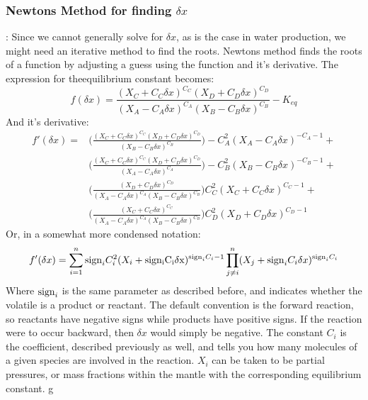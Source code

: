 \subsubsection{Newtons Method for finding $\delta x$}: 
Since we cannot generally solve for $\delta x$, as is the case in water production, we might need an iterative method to find the roots. Newtons method finds the roots of a function by adjusting a guess using the function and it's derivative. The expression for theequilibrium constant becomes: 
\begin{equation}
    f(\delta x) = \frac{(X_C + C_C\delta x)^{C_C} (X_D + C_D\delta x)^{C_D}}{(X_A-C_A\delta x)^{C_A} (X_B-C_B\delta x)^{C_B}} - K_{eq} 
\end{equation}
And it's derivative: 
\begin{equation}
\begin{aligned}
    f'(\delta x) =  & 
    \Big(\frac{(X_C + C_C\delta x)^{C_C} (X_D + C_D\delta x)^{C_D}}{(X_B-C_B\delta x)^{C_B}} \Big) -C_A^2    (X_A - C_A\delta x)^{-C_A-1} +  \\
    & \Big(\frac{(X_C + C_C\delta x)^{C_C} (X_D + C_D\delta x)^{C_D}}{(X_A-C_A\delta x)^{C_A}} \Big) -C_B^2   (X_B - C_B\delta x)^{-C_B-1} + \\
    & \Big( \frac{ (X_D + C_D\delta x)^{C_D}}{(X_A-C_A\delta x)^{C_A} (X_B-C_B\delta x)^{C_B}} \Big)  C_C^2   (X_C + C_C\delta x)^{ C_C-1} + \\
    & \Big( \frac{ (X_C + C_C\delta x)^{C_C}}{(X_A-C_A\delta x)^{C_A} (X_B-C_B\delta x)^{C_B}} \Big)  C_D^2   (X_D + C_D\delta x)^{ C_D-1}  
\end{aligned}
\end{equation}
Or, in a somewhat more condensed notation:
\begin{equation}
    f'(\delta x) = \sum_{i=1}^n {\rm sign}_iC_i^2(X_i+{\rm sign_iC_i\delta x})^{{\rm sign}_i C_i-1} \prod_{j\neq i}^n (X_j+{\rm sign}_i C_i \delta x)^{{\rm sign}_i C_i}
\end{equation}
Where ${\rm sign}_i$ is the same parameter as described before, and indicates whether the volatile is a product or reactant. The default convention is the forward reaction, so reactants have negative signs while products have positive signs. If the reaction were to occur backward, then $\delta x$ would simply be negative. The constant $C_i$ is the coefficient, described previously as well, and tells you how many molecules of a given species are involved in the reaction. $X_i$ can be taken to be partial pressures, or mass fractions within the mantle with the corresponding equilibrium constant. g

